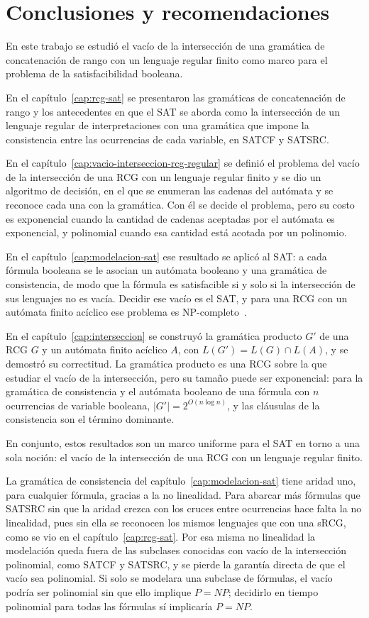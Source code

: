 \documentclass{report}
\begin{document}
\chapter*{Conclusiones y recomendaciones}

En este trabajo se estudió el vacío de la intersección de una gramática
de concatenación de rango con un lenguaje regular finito como marco para
el problema de la satisfacibilidad booleana.

En el capítulo~\ref{cap:rcg-sat} se presentaron las gramáticas de
concatenación de rango y los antecedentes en que el SAT se aborda como
la intersección de un lenguaje regular de interpretaciones con una
gramática que impone la consistencia entre las ocurrencias de cada
variable, en SATCF y SATSRC.

En el capítulo~\ref{cap:vacio-interseccion-rcg-regular} se definió el
problema del vacío de la intersección de una RCG con un lenguaje regular
finito y se dio un algoritmo de decisión, en el que se enumeran las
cadenas del autómata y se reconoce cada una con la gramática. Con él se
decide el problema, pero su costo es exponencial cuando la cantidad de
cadenas aceptadas por el autómata es exponencial, y polinomial cuando esa
cantidad está acotada por un polinomio.

En el capítulo~\ref{cap:modelacion-sat} ese resultado se aplicó al SAT: a
cada fórmula booleana se le asocian un autómata booleano y una gramática
de consistencia, de modo que la fórmula es satisfacible si y solo si la
intersección de sus lenguajes no es vacía. Decidir ese vacío es el SAT,
y para una RCG con un autómata finito acíclico ese problema es
NP-completo~\cite{bertsch2001rcg}.

En el capítulo~\ref{cap:interseccion} se construyó la gramática producto
$G'$ de una RCG $G$ y un autómata finito acíclico $A$, con
$L(G') = L(G) \cap L(A)$, y se demostró su correctitud. La gramática
producto es una RCG sobre la que estudiar el vacío de la intersección,
pero su tamaño puede ser exponencial: para la gramática de consistencia y
el autómata booleano de una fórmula con $n$ ocurrencias de variable
booleana, $|G'| = 2^{O(n\log n)}$, y las cláusulas de la consistencia son
el término dominante.

En conjunto, estos resultados son un marco uniforme para el SAT en torno
a una sola noción: el vacío de la intersección de una RCG con un lenguaje
regular finito.

La gramática de consistencia del capítulo~\ref{cap:modelacion-sat} tiene
aridad uno, para cualquier fórmula, gracias a la no linealidad. Para
abarcar más fórmulas que SATSRC sin que
la aridad crezca con los cruces entre ocurrencias hace falta la no
linealidad, pues sin ella se reconocen los mismos lenguajes que con una
sRCG, como se vio en el capítulo~\ref{cap:rcg-sat}. Por esa misma no
linealidad la modelación queda fuera de las subclases conocidas con vacío
de la intersección polinomial, como SATCF y SATSRC, y se pierde la
garantía directa de que el vacío sea polinomial. Si solo se modelara una subclase
de fórmulas, el vacío podría ser polinomial sin que ello implique
$P = NP$; decidirlo en tiempo polinomial para todas las fórmulas sí
implicaría $P = NP$.
\end{document}
